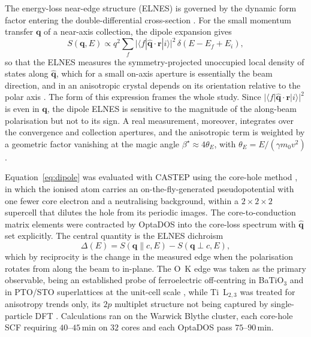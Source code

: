 \documentclass[aps,prb,twocolumn,superscriptaddress,floatfix,nofootinbib]{revtex4-2}
\begin{document}
The energy-loss near-edge structure (ELNES) is governed by the dynamic form factor entering the
double-differential cross-section \citep{Egerton2011}. For the small momentum transfer
$\mathbf{q}$ of a near-axis collection, the dipole expansion gives
\begin{equation}
  S(\mathbf{q},E) \propto q^2 \sum_f
  \big|\langle f| \hat{\mathbf{q}}\cdot\mathbf{r}|i\rangle\big|^2\,\delta(E-E_f+E_i),
  \label{eq:dipole}
\end{equation}
so that the ELNES measures the symmetry-projected unoccupied local density of states along
$\hat{\mathbf{q}}$, which for a small on-axis aperture is essentially the beam direction, and in
an anisotropic crystal depends on its orientation relative to the polar axis
\citep{Nelhiebel1999}. The form of this expression frames the whole study. Since
$|\langle f|\hat{\mathbf{q}}\cdot\mathbf{r}|i\rangle|^2$ is even in $\mathbf{q}$, the dipole
ELNES is sensitive to the magnitude of the along-beam polarisation but not to its sign. A real
measurement, moreover, integrates over the convergence and collection apertures, and the
anisotropic term is weighted by a geometric factor vanishing at the magic angle
$\beta^\star\approx4\theta_E$, with $\theta_E=E/(\gamma m_0v^2)$ \citep{Jouffrey2004}.

Equation~\eqref{eq:dipole} was evaluated with CASTEP \citep{Clark2005} using the core-hole
method \citep{Gao2008}, in which the ionised atom carries an on-the-fly-generated
pseudopotential with one fewer core electron and a neutralising background, within a
$2\times2\times2$ supercell that dilutes the hole from its periodic images. The
core-to-conduction matrix elements were contracted by OptaDOS \citep{Morris2014}
into the core-loss spectrum with $\hat{\mathbf{q}}$ set explicitly. The central quantity is the
ELNES dichroism
\begin{equation}
  \Delta(E) = S(\mathbf{q}\!\parallel\!c,E) - S(\mathbf{q}\!\perp\!c,E),
  \label{eq:dichroism}
\end{equation}
which by reciprocity is the change in the measured edge when the polarisation rotates from along
the beam to in-plane. The O~K edge was taken as the primary observable, being an established probe of ferroelectric
off-centring in BaTiO$_3$ \citep{Bugnet2016} and in PTO/STO superlattices at the unit-cell
scale \citep{TorresPardo2011}, while Ti~L$_{2,3}$ was treated for anisotropy
trends only, its $2p$ multiplet structure not being captured by single-particle DFT
\citep{Mizoguchi2009}. Calculations ran on the Warwick Blythe cluster, each core-hole SCF
requiring $40$--$45$\,min on $32$ cores and each OptaDOS pass $75$--$90$\,min.
\end{document}
